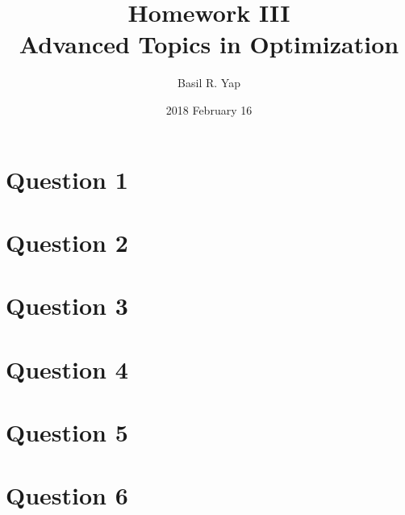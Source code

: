\documentclass[a4paper, fleqn]{article}
\begin{document}
\title{Homework III \\ Advanced Topics in Optimization}
\author{Basil R. Yap}
\date{2018 February 16}
\maketitle

\section{Question 1}

\section{Question 2}

\section{Question 3}

\section{Question 4}

\section{Question 5}

\section{Question 6}
\end{document}
